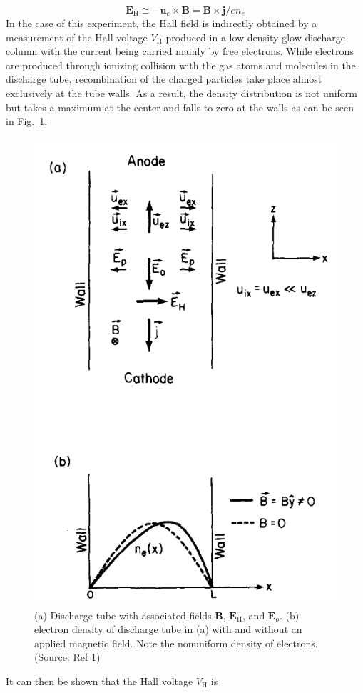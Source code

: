 \documentclass[%
 aip,
rsi,%
 amsmath,amssymb,
 reprint,%
author-numerical,%
]{revtex4-1}
\begin{document}
\begin{equation}
\boldsymbol { E } _ { \mathrm { H } } \cong - \boldsymbol { u } _ { e } \times \boldsymbol { B } = \boldsymbol { B } \times \boldsymbol { j } / e n _ { e }
\label{eq:five}
\end{equation}
\indent In the case of this experiment, the Hall field is indirectly obtained by a measurement of the Hall voltage $V _ { \mathrm { H }} $ produced in a low-density glow discharge column with the current being carried mainly by free electrons. While electrons are produced through ionizing collision with the gas atoms and molecules in the discharge tube, recombination of the charged particles take place almost exclusively at the tube walls.\cite{Kunkel} As a result, the density distribution is not uniform but takes a maximum at the center and falls to zero at the walls as can be seen in Fig.~\ref{fig:density}.

\begin{figure}
\includegraphics[width=0.6\linewidth]{lateximages/density.png} 
\caption{\label{fig:density} (a) Discharge tube with associated fields $\boldsymbol { B }$, $\boldsymbol { E } _ { \mathrm { H } } $, and $\boldsymbol { E } _ { o }$. (b) electron density of discharge tube in (a) with and without an applied magnetic field. Note the nonuniform density of electrons. (Source: Ref 1)}
\end{figure}

It can then be shown\cite{Kunkel} that the Hall voltage $V _ { \mathrm { H }} $ is
\end{document}
